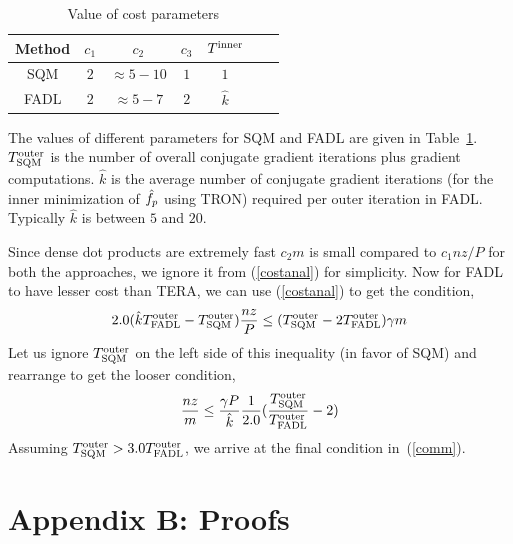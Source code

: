 \documentclass[twoside, 11pt]{article}
\begin{document}
\begin{table}[ht]
\centering %
\begin{tabular}{c c c c c c c} %
\hline\hline %
Method & $c_1$ & $c_2$ & $c_3$ & $T^{\rm inner}$ \\ %
\hline
SQM & $2$ & $\approx 5-10$ & $1$ & $1$ \\
FADL & $2$ & $\approx 5-7$ & $2$ & $\hat{k}$ \\
\hline
\end{tabular}
\caption{Value of cost parameters} %
\label{tab:costparams}
\end{table}

The values of different parameters for SQM and FADL are given in Table~\ref{tab:costparams}. $T^{\rm outer}_{\rm SQM}$ is the number of overall conjugate gradient iterations plus gradient computations. $\hat{k}$ is the average number of conjugate gradient iterations (for the inner minimization of $\hat{f}_p$ using TRON) required per outer iteration in FADL. Typically $\hat{k}$ is between $5$ and $20$.

Since dense dot products are extremely fast $c_2 m$ is small compared to $c_1 nz/P$ for both the approaches, we ignore it from (\ref{costanal}) for simplicity. Now for FADL to have lesser cost than TERA, we can use (\ref{costanal}) to get the condition,
\begin{equation}
2.0(\hat{k}T^{\rm outer}_{\rm FADL} - T^{\rm outer}_{\rm SQM})\frac{nz}{P}  \leq  (T^{\rm outer}_{\rm SQM} - 2 T^{\rm outer}_{\rm FADL}) \gamma m
\end{equation}
Let us ignore $T^{\rm outer}_{\rm SQM}$ on the left side of this inequality (in favor of SQM) and rearrange to get the looser condition,
\begin{equation}
\frac{nz}{m}  \leq  \frac{\gamma P}{\hat{k}} \frac{1}{2.0}(\frac{T^{\rm outer}_{\rm SQM}}{T^{\rm outer}_{\rm FADL}} - 2 )
\end{equation}
Assuming $T^{\rm outer}_{\rm SQM} > 3.0T^{\rm outer}_{\rm FADL}$, we arrive at the final condition in~(\ref{comm}).



%
\section*{Appendix B: Proofs}
\label{sec:proofs}
\end{document}
